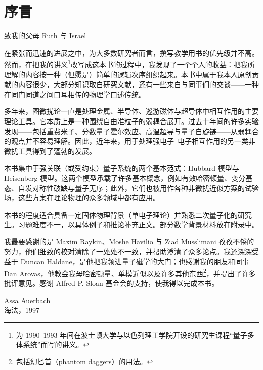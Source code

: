 \chapter*{序言}

\begin{center}
{\kaishu 致我的父母 Ruth 与 Israel}
\end{center}

\medskip

在紧张而迅速的进展之中，为大多数研究者而言，撰写教学用书的优先级并不高。然而，在把我的讲义\footnote{为 1990--1993 年间在波士顿大学与以色列理工学院开设的研究生课程“量子多体系统”而写的讲义。}改写成这本书的过程中，我发现了一个个人的收益：把我所理解的内容按一种（但愿是）简单的逻辑次序组织起来。本书中属于我本人原创贡献的内容很少，大部分知识取自研究文献，还有一些来自与同事们的交谈——一种在同门同道之间口耳相传的物理学口述传统。

多年来，图微扰论一直是处理金属、半导体、巡游磁体与超导体中相互作用的主要理论工具。它本质上是一种围绕自由准粒子的弱耦合展开。过去十年间的许多实验发现——包括重费米子、分数量子霍尔效应、高温超导与量子自旋链——从弱耦合的观点并不容易理解。因此，近年来，用于处理强电子--电子相互作用的另一类非微扰工具得到了蓬勃的发展。

本书集中于强关联（或受约束）量子系统的两个基本范式：Hubbard 模型与 Heisenberg 模型。这两个模型承载了许多基本概念，例如有效哈密顿量、变分基态、自发对称性破缺与量子无序；此外，它们也被用作各种非微扰近似方案的试验场，这些方案在理论物理的众多领域中都有应用。

本书的程度适合具备一定固体物理背景（单电子理论）并熟悉二次量子化的研究生。习题难度不一，以具体例子和推论补充正文。部分数学背景材料放在附录中。

我最要感谢的是 Maxim Raykin、Moshe Havilio 与 Ziad Musslimani 孜孜不倦的努力，他们细致的校对清除了一处处不一致，并帮助澄清了众多论点。我还深深受益于 Duncan Haldane，是他把我领进量子磁学的大门；也感谢我的朋友和同事 Dan Arovas，他教会我母哈密顿量、单模近似以及许多其他东西\footnote{包括幻匕首（phantom daggers）的用法。}，并提出了许多批评意见。感谢 Alfred P. Sloan 基金会的支持，使我得以完成本书。

\begin{flushright}
Assa Auerbach\\
海法，1997
\end{flushright}
